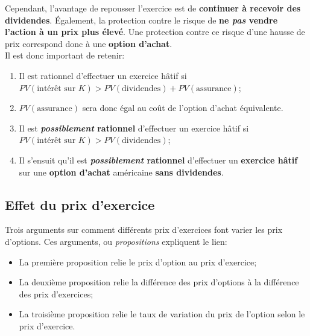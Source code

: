 \documentclass[10pt, french]{article}
\begin{document}
\begin{multicols*}{2}
Cependant, l'avantage de repousser l'exercice est de \textbf{continuer à recevoir des dividendes}. Également, la protection contre le risque de \textbf{ne \textit{pas} vendre l'action à un prix plus élevé}. Une protection contre ce risque d'une hausse de prix correspond donc à une \textbf{option d'achat}.\\

Il est donc important de retenir:
\begin{conceptgen}{}
\begin{enumerate}
	\item	Il est rationnel d'effectuer un exercice hâtif si\\
	 $PV(\text{intérêt sur $K$}) > PV(\text{dividendes}) + PV(\text{assurance})$;
 	\item[]	$PV(\text{assurance})$ sera donc égal au coût de l'option d'achat équivalente.
	\item	Il est \textbf{\textit{possiblement} rationnel} d'effectuer un exercice hâtif si \\
	$PV(\text{intérêt sur $K$}) > PV(\text{dividendes})$;
	\item	Il s'ensuit qu'il est \textbf{\textit{possiblement} rationnel} d'effectuer un \textbf{exercice hâtif} sur une \textbf{option d'achat} américaine \textbf{sans dividendes}.
\end{enumerate}
\end{conceptgen}


\subsection*{Effet du prix d'exercice}
Trois arguments sur comment différents prix d'exercices font varier les prix d'options. Ces arguments, ou \textit{propositions} expliquent le lien:
\begin{itemize}
	\item	La première proposition relie le prix d'option au prix d'exercice;
	\item	La deuxième proposition relie la différence des prix d'options à la différence des prix d'exercices;
	\item	La troisième proposition relie le taux de variation du prix de l'option selon le prix d'exercice.
\end{itemize}


\end{multicols*}
\end{document}
